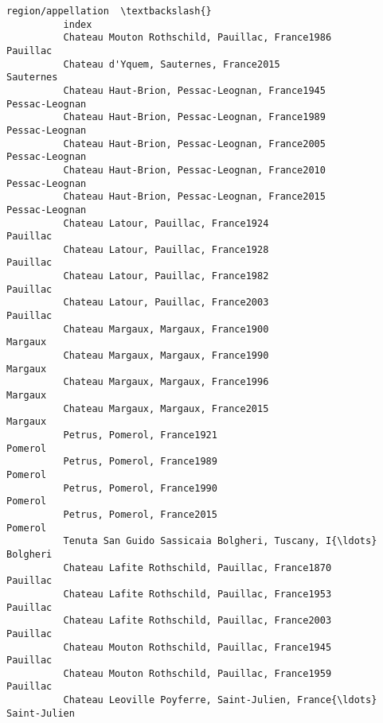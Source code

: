 \documentclass[11pt]{article}
\begin{document}
\begin{Verbatim}[commandchars=\\\{\}]
                                                                         region/appellation  \textbackslash{}
          index                                                                               
          Chateau Mouton Rothschild, Pauillac, France1986                          Pauillac   
          Chateau d'Yquem, Sauternes, France2015                                  Sauternes   
          Chateau Haut-Brion, Pessac-Leognan, France1945                     Pessac-Leognan   
          Chateau Haut-Brion, Pessac-Leognan, France1989                     Pessac-Leognan   
          Chateau Haut-Brion, Pessac-Leognan, France2005                     Pessac-Leognan   
          Chateau Haut-Brion, Pessac-Leognan, France2010                     Pessac-Leognan   
          Chateau Haut-Brion, Pessac-Leognan, France2015                     Pessac-Leognan   
          Chateau Latour, Pauillac, France1924                                     Pauillac   
          Chateau Latour, Pauillac, France1928                                     Pauillac   
          Chateau Latour, Pauillac, France1982                                     Pauillac   
          Chateau Latour, Pauillac, France2003                                     Pauillac   
          Chateau Margaux, Margaux, France1900                                      Margaux   
          Chateau Margaux, Margaux, France1990                                      Margaux   
          Chateau Margaux, Margaux, France1996                                      Margaux   
          Chateau Margaux, Margaux, France2015                                      Margaux   
          Petrus, Pomerol, France1921                                               Pomerol   
          Petrus, Pomerol, France1989                                               Pomerol   
          Petrus, Pomerol, France1990                                               Pomerol   
          Petrus, Pomerol, France2015                                               Pomerol   
          Tenuta San Guido Sassicaia Bolgheri, Tuscany, I{\ldots}                       Bolgheri   
          Chateau Lafite Rothschild, Pauillac, France1870                          Pauillac   
          Chateau Lafite Rothschild, Pauillac, France1953                          Pauillac   
          Chateau Lafite Rothschild, Pauillac, France2003                          Pauillac   
          Chateau Mouton Rothschild, Pauillac, France1945                          Pauillac   
          Chateau Mouton Rothschild, Pauillac, France1959                          Pauillac   
          Chateau Leoville Poyferre, Saint-Julien, France{\ldots}                   Saint-Julien   

\end{Verbatim}
\end{document}
